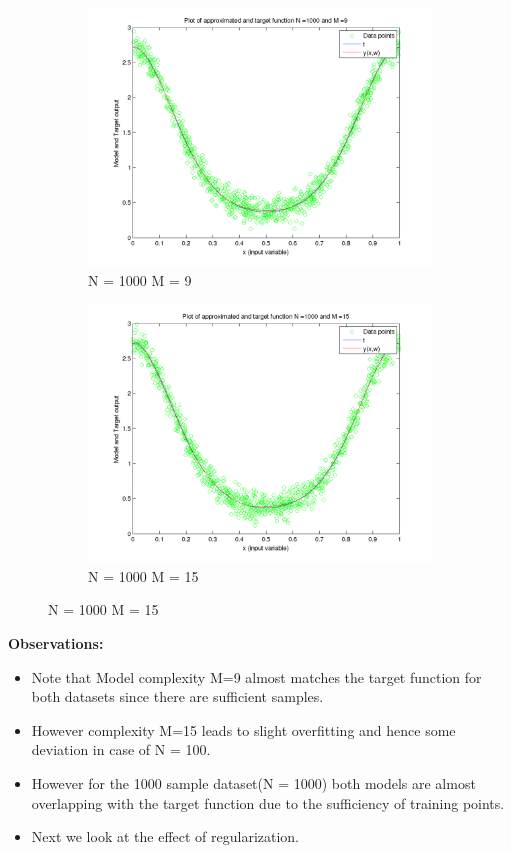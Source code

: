 \documentclass{article}
\begin{document}
\begin{figure}[H]
\begin{subfigure}{.5\textwidth}
\centering
\includegraphics[width=\linewidth]{VaryingN_N1000M9}
\caption{N = 1000 M = 9}
\end{subfigure}
\begin{subfigure}{.5\textwidth}
\includegraphics[width=\linewidth]{VaryingN_N1000M15}
\caption{N = 1000 M = 15}
\end{subfigure}



\end{figure}

\textbf{Observations: \newline}
\begin{itemize}
\item Note that Model complexity M=9 almost matches the target function for both datasets since there are sufficient samples.
\item However complexity M=15 leads to slight overfitting and hence some deviation in case of N = 100.
\item However for the 1000 sample dataset(N = 1000) both models are almost overlapping with the target function due to the sufficiency of training points.
\item Next we look at the effect of regularization.
\end{itemize}
\newpage
\end{document}
